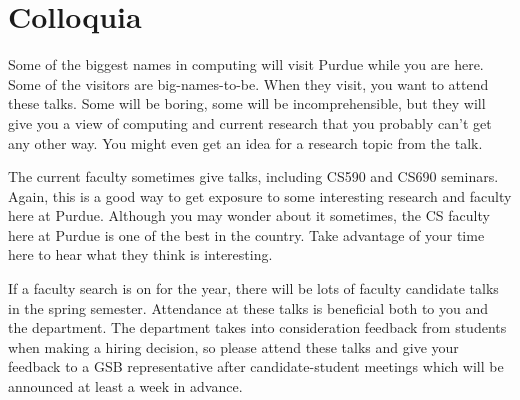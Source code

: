 \section{Colloquia}

Some of the biggest names in computing will visit Purdue while you are here. Some of the visitors are big-names-to-be. When they visit, you want to attend these talks. Some will be boring, some will be incomprehensible, but they will give you a view of computing and current research that you probably can't get any other way. You might even get an idea for a research topic from the talk.

The current faculty sometimes give talks, including CS590 and CS690 seminars. Again, this is a good way to get exposure to some interesting research and faculty here at Purdue. Although you may wonder about it sometimes, the CS faculty here at Purdue is one of the best in the country. Take advantage of your time here to hear what they think is interesting.

If a faculty search is on for the year, there will be lots of faculty candidate talks in the spring semester. Attendance at these talks is beneficial both to you and the department. The department takes into consideration feedback from students when making a hiring decision, so please attend these talks and give your feedback to a GSB representative after candidate-student meetings which will be announced at least a week in advance.